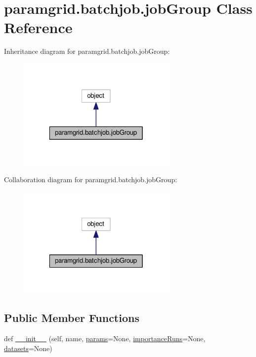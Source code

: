 \hypertarget{classparamgrid_1_1batchjob_1_1jobGroup}{}\section{paramgrid.\+batchjob.\+job\+Group Class Reference}
\label{classparamgrid_1_1batchjob_1_1jobGroup}


Inheritance diagram for paramgrid.\+batchjob.\+job\+Group\+:
\nopagebreak
\begin{figure}[H]
\begin{center}
\leavevmode
\includegraphics[width=220pt]{classparamgrid_1_1batchjob_1_1jobGroup__inherit__graph}
\end{center}
\end{figure}


Collaboration diagram for paramgrid.\+batchjob.\+job\+Group\+:
\nopagebreak
\begin{figure}[H]
\begin{center}
\leavevmode
\includegraphics[width=220pt]{classparamgrid_1_1batchjob_1_1jobGroup__coll__graph}
\end{center}
\end{figure}
\subsection*{Public Member Functions}
\begin{DoxyCompactItemize}
\item 
def \mbox{\hyperlink{classparamgrid_1_1batchjob_1_1jobGroup_ad156ae536eceab15dd24500ab3f3732b}{\+\_\+\+\_\+init\+\_\+\+\_\+}} (self, name, \mbox{\hyperlink{classparamgrid_1_1batchjob_1_1jobGroup_ae9402ea80a2ddf6ba1d83ee9d71d780a}{params}}=None, \mbox{\hyperlink{classparamgrid_1_1batchjob_1_1jobGroup_ab9fd9a0a9ce457ff6b025a63b578af83}{importance\+Runs}}=None, \mbox{\hyperlink{classparamgrid_1_1batchjob_1_1jobGroup_a065f884cd181e4252469922ebe03e68b}{datasets}}=None)
\end{DoxyCompactItemize}
